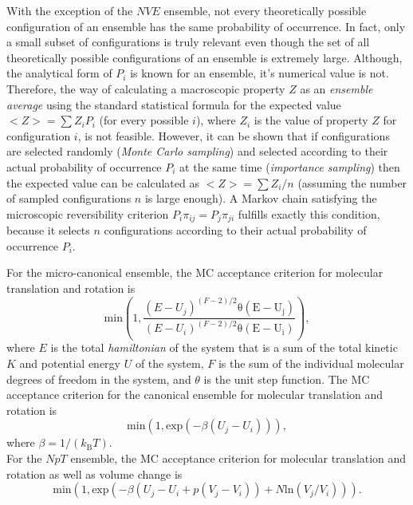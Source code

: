 With the exception of the $NVE$ ensemble, not every theoretically possible configuration of an ensemble has the same probability of occurrence. In fact, only a small subset of configurations is truly relevant even though the set of all theoretically possible configurations of an ensemble is extremely large. Although, the analytical form of $P_i$ is known for an ensemble, it's numerical value is not. Therefore, the way of calculating a macroscopic property $Z$ as an \textit{ensemble average} using the standard statistical formula for the expected value $<Z>=\sum Z_i P_i$ (for every possible $i$), where $Z_i$ is the value of property $Z$ for configuration $i$, is not feasible. However, it can be shown that if configurations are selected randomly (\textit{Monte Carlo sampling}) and selected according to their actual probability of occurrence $P_i$ at the same time (\textit{importance sampling}) then the expected value can be calculated as $<Z>=\sum Z_i/n$ (assuming the number of sampled configurations $n$ is large enough). A Markov chain satisfying the microscopic reversibility criterion $P_i \pi_{ij}=P_j \pi_{ji}$ fulfills exactly this condition, because it selects $n$ configurations according to their actual probability of occurrence $P_i$.

For the micro-canonical ensemble, the MC acceptance criterion for molecular translation and rotation is 
\begin{equation}
\mathrm{min}\left(1, \frac{(E-U_j)^{(F-2)/2} \mathrm{\theta(E-U_j)}}{(E-U_i)^{(F-2)/2} \mathrm{\theta(E-U_i)}} \right) ,
\label{eq:acccritNVE}
\end{equation}
where $E$ is the total \textit{hamiltonian} of the system that is a sum of the total kinetic $K$ and potential energy $U$ of the system, $F$ is the sum of the individual molecular degrees of freedom in the system, and $\theta$ is the unit step function. %
The MC acceptance criterion for the canonical ensemble for molecular translation and rotation is 
\begin{equation}
\mathrm{min}\left(1, \mathrm{exp}(-\beta(U_j-U_i)) \right),
\label{eq:acccritNVT}
\end{equation}
where $\beta = 1 / (k_\mathrm{B}T)$.\\

For the $NpT$ ensemble, the MC acceptance criterion for molecular translation and rotation as well as volume change is
\begin{equation}
\text{min}\left(1, \text{exp}( -\beta(U_j-U_i+p(V_j-V_i))+N\text{ln}(V_j/V_i) )  \right).
\label{eq:acccritNVT}
\end{equation}

